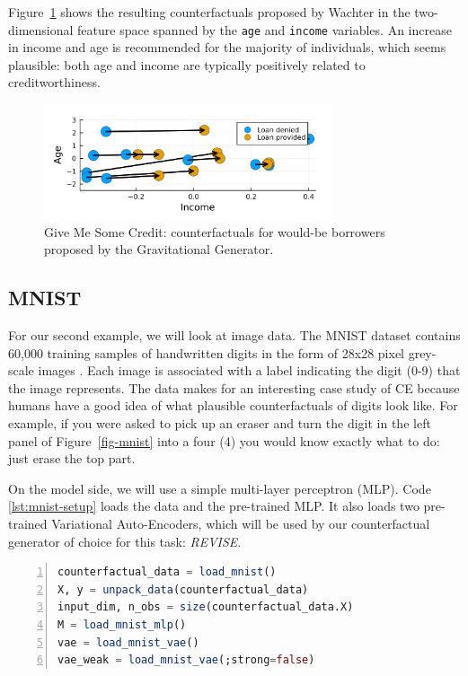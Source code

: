 \documentclass[
  letterpaper,
  DIV=11,
  numbers=noendperiod]{scrartcl}
\begin{document}
Figure~\ref{fig-credit} shows the resulting counterfactuals proposed by
Wachter in the two-dimensional feature space spanned by the \texttt{age}
and \texttt{income} variables. An increase in income and age is
recommended for the majority of individuals, which seems plausible: both
age and income are typically positively related to creditworthiness.

\begin{figure}

{\centering \includegraphics[width=3.33333in,height=1.33333in]{www/credit.png}

}

\caption{\label{fig-credit}Give Me Some Credit: counterfactuals for
would-be borrowers proposed by the Gravitational Generator.}

\end{figure}

\hypertarget{mnist}{%
\subsection{MNIST}\label{mnist}}

For our second example, we will look at image data. The MNIST dataset
contains 60,000 training samples of handwritten digits in the form of
28x28 pixel grey-scale images \cite{lecun1998mnist}. Each image is
associated with a label indicating the digit (0-9) that the image
represents. The data makes for an interesting case study of CE because
humans have a good idea of what plausible counterfactuals of digits look
like. For example, if you were asked to pick up an eraser and turn the
digit in the left panel of Figure~\ref{fig-mnist} into a four (4) you
would know exactly what to do: just erase the top part.

On the model side, we will use a simple multi-layer perceptron (MLP).
Code \ref{lst:mnist-setup} loads the data and the pre-trained MLP. It
also loads two pre-trained Variational Auto-Encoders, which will be used
by our counterfactual generator of choice for this task: \emph{REVISE}.

\begin{lstlisting}[language=Julia, escapechar=@, numbers=left, label={lst:mnist-setup}, caption={Loading pre-trained models and data for MNIST.}]
counterfactual_data = load_mnist()
X, y = unpack_data(counterfactual_data)
input_dim, n_obs = size(counterfactual_data.X)
M = load_mnist_mlp()
vae = load_mnist_vae()
vae_weak = load_mnist_vae(;strong=false)
\end{lstlisting}
\end{document}
